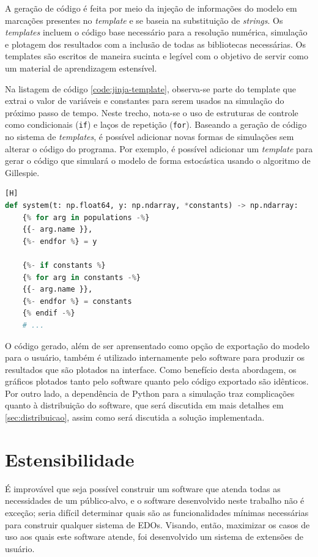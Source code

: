\documentclass[
	12pt,				%
	openright,			%
	oneside,			%
	a4paper,			%
	main=brazil,
	english,			%
	]{ufsj-abntex2}
\begin{document}
A geração de código é feita por meio da injeção de informações do modelo em marcações presentes no \textit{template} e se baseia na substituição de \textit{strings}. Os \textit{templates} incluem o código base necessário para a resolução numérica, simulação e plotagem dos resultados com a inclusão de todas as bibliotecas necessárias. Os templates são escritos de maneira sucinta e legível com o objetivo de servir como um material de aprendizagem estensível.

Na listagem de código \ref{code:jinja-template}, observa-se parte do template que extrai o valor de variáveis e constantes para serem usados na simulação do próximo passo de tempo. Neste trecho, nota-se o uso de estruturas de controle como condicionais (\texttt{if}) e laços de repetição (\texttt{for}). Baseando a geração de código no sistema de \textit{templates}, é possível adicionar novas formas de simulações sem alterar o código do programa. Por exemplo, é possível adicionar um \textit{template} para gerar o código que simulará o modelo de forma estocástica usando o algoritmo de Gillespie.

\begin{lstlisting}[language=Python, label=code:jinja-template, caption=Trecho do \textit{template} responsável por extrair o valor de variáveis e constantes][H]
def system(t: np.float64, y: np.ndarray, *constants) -> np.ndarray:
    {% for arg in populations -%}
    {{- arg.name }},
    {%- endfor %} = y

    {%- if constants %}
    {% for arg in constants -%}
    {{- arg.name }},
    {%- endfor %} = constants
    {% endif -%}
    # ...
\end{lstlisting}

O código gerado, além de ser aprensentado como opção de exportação do modelo para o usuário, também é utilizado internamente pelo software para produzir os resultados que são plotados na interface. Como benefício desta abordagem, os gráficos plotados tanto pelo software quanto pelo código exportado são idênticos. Por outro lado, a dependência de Python para a simulação traz complicações quanto à distribuição do software, que será discutida em mais detalhes em \ref{sec:distribuicao}, assim como será discutida a solução implementada.

\section{Estensibilidade}
\label{sec:estensibilidade}

É improvável que seja possível construir um software que atenda todas as necessidades de um público-alvo, e o software desenvolvido neste trabalho não é exceção; seria difícil determinar quais são as funcionalidades mínimas necessárias para construir qualquer sistema de EDOs. Visando, então, maximizar os casos de uso aos quais este software atende, foi desenvolvido um sistema de extensões de usuário. 
\end{document}
